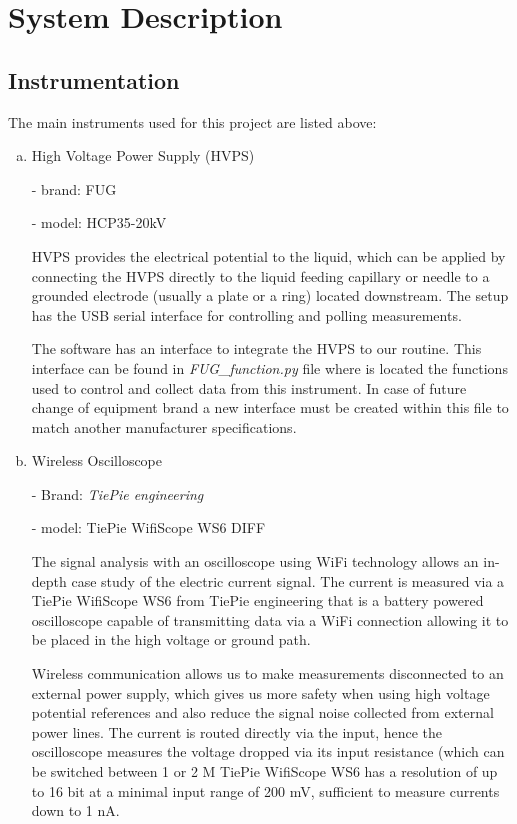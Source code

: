 \chapter[System Description]{System Description}
\label{chap:system_description}


\section{Instrumentation}
\label{sec:instrumentation}

The main instruments used for this project are listed above:

\begin{enumerate}[a)]

  \item High Voltage Power Supply (HVPS)
  
     - brand: FUG
    
     - model: HCP35-20kV
    
    HVPS provides the electrical potential to the liquid, which can be applied by connecting the HVPS directly to the liquid feeding capillary or needle to a grounded electrode (usually a plate or a ring) located downstream.\cite{Monica}
    The setup has the USB serial interface for controlling and polling measurements.
    
    The software has an interface to integrate the HVPS to our routine. This interface can be found in \emph{FUG\_function.py} file where is located the functions used to control and collect data from this instrument.
    In case of future change of equipment brand a new interface must be created within this file to match another manufacturer specifications.

  \item Wireless Oscilloscope
  
     - Brand: \emph{TiePie engineering}

     - model: TiePie WifiScope WS6 DIFF
    
    The signal analysis with an oscilloscope using WiFi technology allows an in-depth case study of the electric current signal.
    The current is measured via a TiePie WifiScope WS6 from TiePie engineering that is a battery powered oscilloscope capable of transmitting data via a WiFi connection allowing it to be placed in the high voltage or ground path.
    
    Wireless communication allows us to make measurements disconnected to an external power supply, which gives us more safety when using high voltage potential references and also reduce the signal noise collected from external power lines.
    The current is routed directly via the input, hence the oscilloscope measures the voltage dropped via its input resistance (which can be switched between 1 or 2 M%
    TiePie WifiScope WS6 has a resolution of up to 16 bit at a minimal input range of 200 mV, sufficient to measure currents down to 1 nA.


\end{enumerate}
